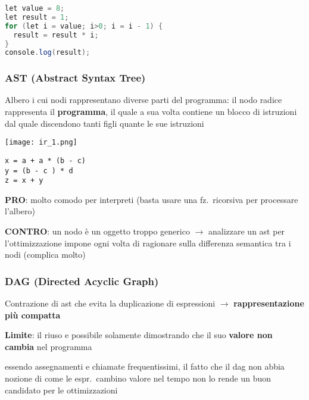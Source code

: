 \begin{lstlisting}[language=java]
let value = 8;
let result = 1;
for (let i = value; i>0; i = i - 1) {
  result = result * i;
}
console.log(result);\end{lstlisting}

\vspace{-.5em}
\subsubsection{AST (Abstract Syntax Tree)}

Albero i cui nodi rappresentano diverse parti del programma: il nodo radice rappresenta il \textbf{programma}, il quale a sua volta contiene un blocco di istruzioni dal quale discendono tanti figli quante le sue istruzioni

\noindent\begin{minipage}[c]{.3\textwidth}
\texttt{[image: ir\_1.png]}
\end{minipage}
\begin{minipage}[c]{.7\textwidth}
\begin{lstlisting}
x = a + a * (b - c)
y = (b - c ) * d
z = x + y\end{lstlisting}
\textbf{PRO}: molto comodo per interpreti (basta usare una fz.~ricorsiva per processare l'albero)

\textbf{CONTRO}: un nodo \`e un oggetto troppo generico $\rightarrow$ analizzare un ast per l'ottimizzazione impone ogni volta di ragionare sulla differenza semantica tra i nodi (complica molto)
\end{minipage}


\vspace{-.5em}
\subsubsection{DAG (Directed Acyclic Graph)}

Contrazione di ast che evita la duplicazione di espressioni $\rightarrow$ \textbf{rappresentazione pi\`u compatta}

\noindent\textbf{Limite}: il riuso e possibile solamente dimostrando che il suo \textbf{valore non cambia} nel programma
\begin{emphasize}
  essendo assegnamenti e chiamate frequentissimi, il fatto che il dag non abbia nozione di come le espr.~cambino valore nel tempo non lo rende un buon candidato per le ottimizzazioni
\end{emphasize}

